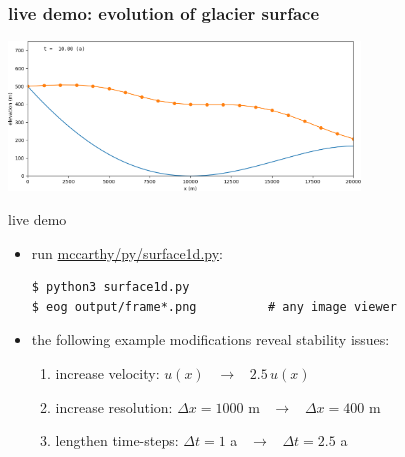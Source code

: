 \documentclass[10pt,dvipsnames]{beamer}
\begin{document}
\begin{frame}[fragile]
\frametitle{live demo: evolution of glacier surface}
\begin{center}
\includegraphics[width=0.7\textwidth]{frame010}
\end{center}

\bigskip
\begin{block}{live demo}
\begin{itemize}
\item run \href{https://github.com/bueler/mccarthy/blob/master/py/surface1d.py}{mccarthy/py/surface1d.py}:
\begin{verbatim}
$ python3 surface1d.py
$ eog output/frame*.png          # any image viewer
\end{verbatim}
\item the following example modifications reveal stability issues:
    \begin{enumerate}
    \item increase velocity: \quad $u(x)$ \, $\to$ \, $2.5\, u(x)$
    \item increase resolution: \quad $\Delta x=1000$ m \, $\to$ \, $\Delta x=400$ m
    \item lengthen time-steps: \quad $\Delta t = 1$ a \, $\to$ \, $\Delta t = 2.5$ a
    \end{enumerate}
\end{itemize}
\end{block}
\end{frame}
\end{document}
